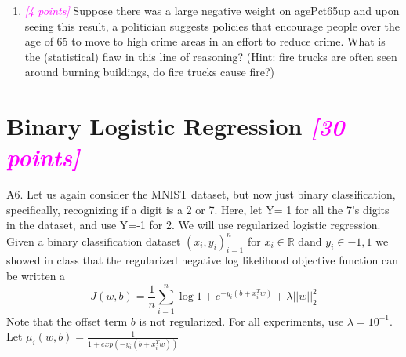 \documentclass{article}
\newcommand{\field}[1]{\mathbb{#1}}
\newcommand{\1}{\mathbf{1}}
\newcommand{\R}{\field{R}} %
\newcommand{\points}[1]{\small\textcolor{magenta}{\emph{[#1 points]}} \normalsize}
\begin{document}
\begin{enumerate}
    

    
    \item \points{4} Suppose there was a large negative weight on agePct65up and upon seeing this result, a politician suggests policies that encourage people over the age of 65 to move to high crime areas in an effort to reduce crime. What is the (statistical) flaw in this line of reasoning? (Hint:  fire trucks are often seen around burning buildings, do fire trucks cause fire?)
\end{enumerate}



\newpage
\section*{Binary Logistic Regression \points{30}}
A6. Let us again consider the MNIST dataset, but now just binary classification, specifically, recognizing if a digit is a 2 or 7. Here, let Y= 1 for all the 7’s digits in the dataset, and use Y=-1 for 2. We will use regularized logistic regression.  Given a binary classification dataset ${(x_i,y_i)}^n_{i=1}$ for $x_i\in\R$ dand $y_i\in {-1,1}$ we showed in class that the regularized negative log likelihood objective function can be written a
$$J(w,b) = \frac{1}{n} \sum_{i=1}^n \log{ 1 + e^{-y_i(b+x^T_iw)} } + \lambda||w||^2_2$$
Note that the offset term $b$ is not regularized. For all experiments, use $\lambda = 10^{-1}$. Let $\mu_i(w,b) = \frac{1}{1+exp(-y_i(b+x^T_iw))}$
\end{document}
